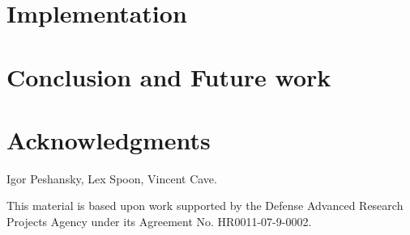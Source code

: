 \documentclass[nocopyrightspace,preprint,9pt]{sigplanconf}
\begin{document}
\section{Implementation}\label{sec:implementation}


\section{Conclusion and Future work}\label{sec:future}\label{sec:conclusions}



\section*{Acknowledgments}

Igor Peshansky,
Lex Spoon,
Vincent Cave.

This material is based upon work supported by the Defense
Advanced Research Projects Agency under its Agreement No.
HR0011-07-9-0002.




\balance


% 
\end{document}
